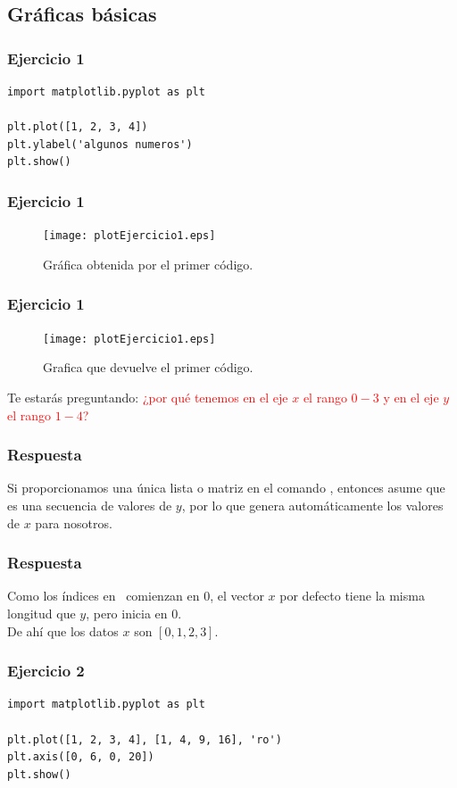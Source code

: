 \subsection{Gráficas básicas}
\begin{frame}[fragile]
\frametitle{Ejercicio 1}
\begin{lstlisting}[caption=Gráfica básica, basicstyle=\linespread{1.2}\ttfamily\small, columns=fullflexible]
import matplotlib.pyplot as plt

plt.plot([1, 2, 3, 4])
plt.ylabel('algunos numeros')
plt.show()
\end{lstlisting}
\end{frame}
\begin{frame}[fragile]
\frametitle{Ejercicio 1}
\begin{figure}
	\centering
	\texttt{[image: plotEjercicio1.eps]}
	\caption{Gráfica obtenida por el primer código.}
\end{figure}
\end{frame}
\begin{frame}[fragile]
\frametitle{Ejercicio 1}
\begin{figure}
	\centering
	\texttt{[image: plotEjercicio1.eps]}
	\caption{Grafica que devuelve el primer código.}
\end{figure}
Te estarás preguntando: \textcolor{red}{ ¿por qué tenemos en el eje $x$ el rango $0-3$ y en el eje $y$ el rango  $1-4$?}
\end{frame}
\begin{frame}
\frametitle{Respuesta}
Si proporcionamos una única lista o matriz en el comando , entonces  asume que es una secuencia de valores de $y$, por lo que genera automáticamente los valores de $x$ para nosotros. 
\end{frame}
\begin{frame}
\frametitle{Respuesta}	
Como los índices en \python\ comienzan en $0$, el vector $x$ por defecto tiene la misma longitud que $y$, pero inicia en $0$. 
\\
\bigskip
De ahí que los datos $x$ son $[0,1,2,3]$.
\end{frame}
\begin{frame}[fragile]
\frametitle{Ejercicio 2}
\begin{lstlisting}[caption=Código con más elementos, basicstyle=\linespread{1.2}\ttfamily\small, columns=fullflexible]
import matplotlib.pyplot as plt

plt.plot([1, 2, 3, 4], [1, 4, 9, 16], 'ro')
plt.axis([0, 6, 0, 20])
plt.show()
\end{lstlisting}
\end{frame}
